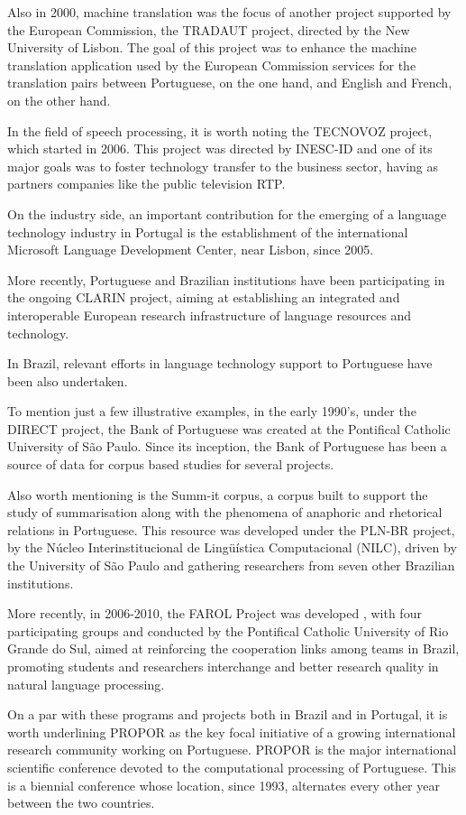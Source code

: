 \begin{multicols}{2}
Also in 2000, machine translation was the focus of another project supported by the European Commission,
the TRADAUT project, directed by the New University of Lisbon. The goal of this project
was to enhance the machine translation application used by the European Commission services
for the translation pairs between Portuguese, on the one hand, and English and French, on the other hand.

In the field of speech processing, it is worth noting the TECNOVOZ project, which started in 2006.
This project was directed by INESC-ID and one of its major goals was to foster technology
transfer to the business sector, having as partners companies like the public television RTP.

On the industry side, an important contribution for the emerging of a language technology industry in Portugal is the establishment of the international Microsoft Language Development Center, near Lisbon, since 2005.

More recently, Portuguese and Brazilian institutions have been participating in the ongoing CLARIN project, aiming at establishing an integrated and interoperable European research infrastructure of language resources and technology.

In Brazil, relevant efforts in language technology support to Portuguese have been also undertaken. 

To mention just a few illustrative examples, in the early 1990's, under the DIRECT project, the Bank of Portuguese was created at the 
Pontifical Catholic University of São Paulo. Since its inception, the Bank of Portuguese has been a source of data for corpus based studies for several projects. 

Also worth mentioning is the Summ-it corpus, a corpus built to support the study of summarisation along with the phenomena of anaphoric and rhetorical relations in Portuguese. This resource was developed under the PLN-BR project, by the Núcleo Interinstitucional de Lingüística Computacional (NILC), driven by the University of São Paulo and gathering researchers from seven other Brazilian institutions. 

More recently, in 2006-2010, the FAROL Project was developed , with four participating groups and conducted by the Pontifical Catholic University of Rio Grande do Sul, aimed at reinforcing the cooperation links among teams in Brazil, promoting students and researchers interchange and better research quality in natural language processing.

On a par with these programs and projects both in Brazil and in Portugal, it is worth underlining PROPOR
as the key focal initiative of a growing international research community
working on Portuguese. PROPOR is the major international scientific conference devoted
to the computational processing of Portuguese. This is a
biennial conference whose location, since 1993, alternates every other year between the two countries.


\end{multicols}
